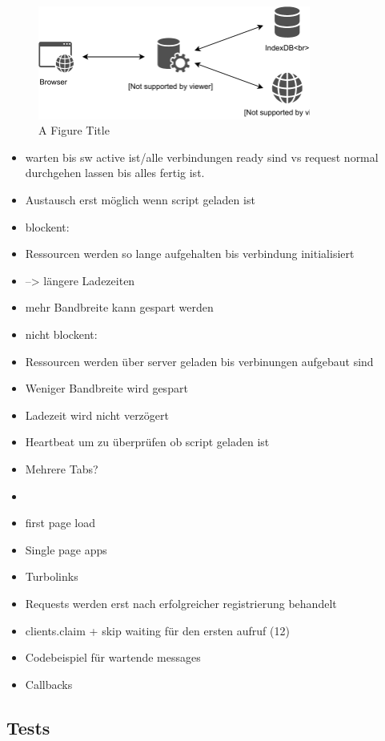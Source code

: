 \begin{figure}[!h]
	\centering
	\includegraphics[width=0.8\textwidth]{figures/ServiceWorker}
	\caption[A Figure Short-Title]{A Figure Title}
	\label{fig:sequenceDiagram}
\end{figure}
\begin{itemize}
  \item warten bis sw active ist/alle verbindungen ready sind vs request normal durchgehen lassen bis alles fertig ist.
  \item 	Austausch erst möglich wenn script geladen ist
  \item 	blockent: 
  \item 		Ressourcen werden so lange aufgehalten bis verbindung initialisiert
  \item 		--> längere Ladezeiten
  \item 		mehr Bandbreite kann gespart werden
  \item 	nicht blockent: 
  \item 		Ressourcen werden über server geladen bis verbinungen aufgebaut sind
  \item 		Weniger Bandbreite wird gespart
  \item 		Ladezeit wird nicht verzögert
  \item 		Heartbeat um zu überprüfen ob script geladen ist
  \item Mehrere Tabs?
  \item 		
  \item first page load
  \item Single page apps
  \item Turbolinks
  \item Requests werden erst nach erfolgreicher registrierung behandelt
  \item clients.claim + skip waiting für den ersten aufruf (12)
  \item Codebeispiel für wartende messages
  \item 	Callbacks
\end{itemize}

\subsection{Tests}

